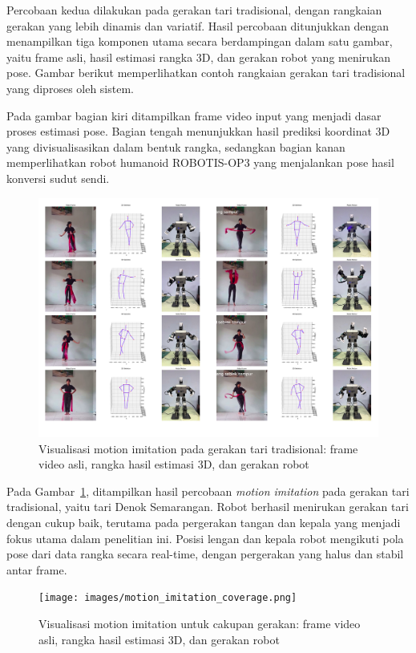 Percobaan kedua dilakukan pada gerakan tari tradisional, dengan rangkaian gerakan yang lebih dinamis dan variatif. Hasil percobaan ditunjukkan dengan menampilkan tiga komponen utama secara berdampingan dalam satu gambar, yaitu frame asli, hasil estimasi rangka 3D, dan gerakan robot yang menirukan pose. Gambar berikut memperlihatkan contoh rangkaian gerakan tari tradisional yang diproses oleh sistem.

Pada gambar bagian kiri ditampilkan frame video input yang menjadi dasar proses estimasi pose. Bagian tengah menunjukkan hasil prediksi koordinat 3D yang divisualisasikan dalam bentuk rangka, sedangkan bagian kanan memperlihatkan robot humanoid ROBOTIS-OP3 yang menjalankan pose hasil konversi sudut sendi.

\begin{figure}[H]
    \centering
    \includegraphics[width=\textwidth]{images/hasil.jpg}
    \caption{Visualisasi motion imitation pada gerakan tari tradisional: frame video asli, rangka hasil estimasi 3D, dan gerakan robot}
    \label{fig:motion_imitation_tari}
\end{figure}

Pada Gambar~\ref{fig:motion_imitation_tari}, ditampilkan hasil percobaan \textit{motion imitation} pada gerakan tari tradisional, yaitu tari Denok Semarangan. Robot berhasil menirukan gerakan tari dengan cukup baik, terutama pada pergerakan tangan dan kepala yang menjadi fokus utama dalam penelitian ini. Posisi lengan dan kepala robot mengikuti pola pose dari data rangka secara real-time, dengan pergerakan yang halus dan stabil antar frame.

\begin{figure}[H]
    \centering
    \texttt{[image: images/motion\_imitation\_coverage.png]}
    \caption{Visualisasi motion imitation untuk cakupan gerakan: frame video asli, rangka hasil estimasi 3D, dan gerakan robot}
    \label{fig:motion_imitation_coverage}
\end{figure}

